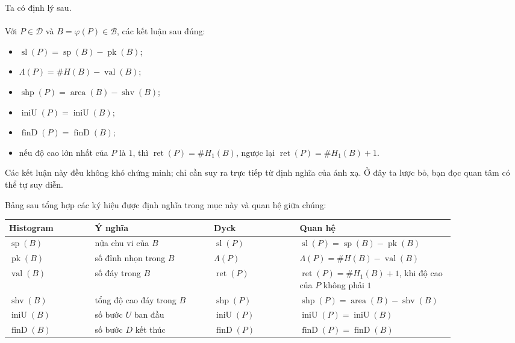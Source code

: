 \documentclass[11pt]{article}
\begin{document}
Ta có định lý sau.

\paragraph{}
Với \(P\in\mathcal D\) và \(B=\varphi(P)\in\mathcal B\), các kết luận sau
đúng:
\begin{itemize}
  \item \(\operatorname{sl}(P)=\operatorname{sp}(B)-\operatorname{pk}(B)\);
  \item \(\Lambda(P)=\#H(B)-\operatorname{val}(B)\);
  \item \(\operatorname{shp}(P)=\operatorname{area}(B)-\operatorname{shv}(B)\);
  \item \(\operatorname{iniU}(P)=\operatorname{iniU}(B)\);
  \item \(\operatorname{finD}(P)=\operatorname{finD}(B)\);
  \item nếu độ cao lớn nhất của \(P\) là \(1\), thì
        \(\operatorname{ret}(P)=\#H_1(B)\), ngược lại
        \(\operatorname{ret}(P)=\#H_1(B)+1\).
\end{itemize}

Các kết luận này đều không khó chứng minh; chỉ cần suy ra trực tiếp từ định
nghĩa của ánh xạ. Ở đây ta lược bỏ, bạn đọc quan tâm có thể tự suy diễn.

Bảng sau tổng hợp các ký hiệu được định nghĩa trong mục này và quan hệ giữa
chúng:

\begin{center}
\small
\begin{tabular}{p{0.18\linewidth} p{0.25\linewidth} p{0.18\linewidth} p{0.25\linewidth}}
\textbf{Histogram} & \textbf{Ý nghĩa} & \textbf{Dyck} & \textbf{Quan hệ} \\
\hline
\(\operatorname{sp}(B)\) & nửa chu vi của \(B\) &
\(\operatorname{sl}(P)\) & \(\operatorname{sl}(P)=\operatorname{sp}(B)-\operatorname{pk}(B)\) \\
\(\operatorname{pk}(B)\) & số đỉnh nhọn trong \(B\) &
\(\Lambda(P)\) & \(\Lambda(P)=\#H(B)-\operatorname{val}(B)\) \\
\(\operatorname{val}(B)\) & số đáy trong \(B\) &
\(\operatorname{ret}(P)\) & \(\operatorname{ret}(P)=\#H_1(B)+1\), khi độ cao của \(P\) không phải \(1\) \\
\(\operatorname{shv}(B)\) & tổng độ cao đáy trong \(B\) &
\(\operatorname{shp}(P)\) & \(\operatorname{shp}(P)=\operatorname{area}(B)-\operatorname{shv}(B)\) \\
\(\operatorname{iniU}(B)\) & số bước \(U\) ban đầu &
\(\operatorname{iniU}(P)\) & \(\operatorname{iniU}(P)=\operatorname{iniU}(B)\) \\
\(\operatorname{finD}(B)\) & số bước \(D\) kết thúc &
\(\operatorname{finD}(P)\) & \(\operatorname{finD}(P)=\operatorname{finD}(B)\)
\end{tabular}
\end{center}
\end{document}
